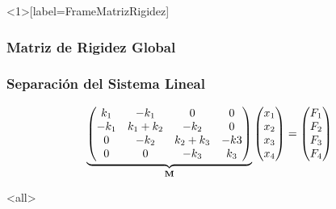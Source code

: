 \mode*

\begin{frame}<1>[label=FrameMatrizRigidez]
  \frametitle<presentation>{Matriz de Rigidez Global}
  \frametitle<2->{Separación del Sistema Lineal}

  \begin{equation} \label{eqSistemaLineal}
    \underbrace{  \matriz }_{\mathbf{M}} \vectorx  =  \vectorF
  \end{equation}

\end{frame}

\mode<all>
